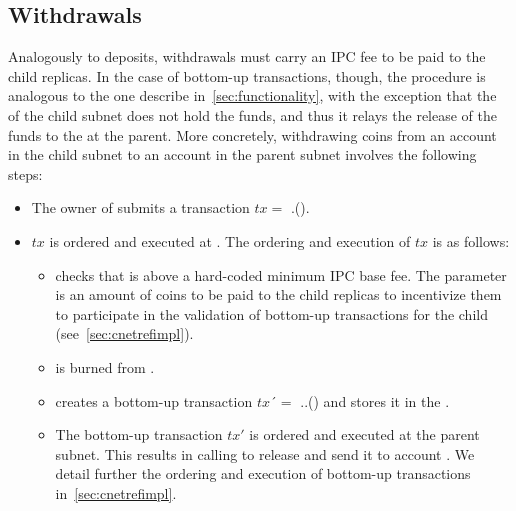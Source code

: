 \subsection{Withdrawals}
Analogously to deposits, withdrawals must carry an IPC fee to be paid to the child replicas. In the case of bottom-up transactions, though, the procedure is analogous to the one describe in~\cref{sec:functionality}, with the exception that the \sa of the child subnet does not hold the funds, and thus it relays the release of the funds to the \gw at the parent. More concretely, withdrawing  coins from an account  in the child subnet  to an account  in the parent subnet  involves the following steps:
\begin{itemize}
\item The owner of  submits a transaction $tx=$ \gw.().
 \item $tx$ is ordered and executed at . The ordering and execution of $tx$ is as follows:
 \begin{itemize}
        \item \gw checks that  is above a hard-coded minimum IPC base fee. The parameter  is an amount of coins to be paid to the child replicas to incentivize them to participate in the validation of bottom-up transactions for the child (see~\cref{sec:cnetrefimpl}). 
        \item {} is burned from .
        \item \gw creates a bottom-up transaction $tx´=$ ..() and stores it in the \bqueue.
        \item The bottom-up transaction $tx'$ is ordered and executed at the parent subnet. This results in  calling \gw to release  and send it to account . We detail further the ordering and execution of bottom-up transactions in~\cref{sec:cnetrefimpl}.
    \end{itemize}
\end{itemize}

